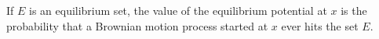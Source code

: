 If $E$ is an equilibrium set, the value of the equilibrium potential at $x$ is the probability that a Brownian motion process started at $x$ ever hits the set $E$.
